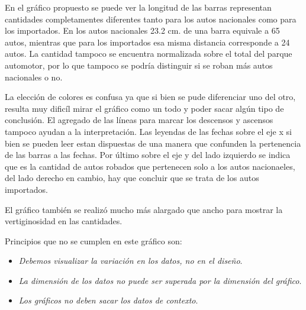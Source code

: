 \documentclass[
	12pt, %
	spanish, %
]{fphw}
\begin{document}
En el gráfico propuesto se puede ver la longitud de las barras representan cantidades completamentes diferentes tanto para los autos nacionales como para los importados. En los autos nacionales 23.2 cm. de una barra equivale a 65 autos, mientras que para los importados esa misma distancia corresponde a 24 autos. La cantidad tampoco se encuentra normalizada sobre el total del parque automotor, por lo que tampoco se podría distinguir si se roban más autos nacionales o no.

La elección de colores es confusa ya que si bien se pude diferenciar uno del otro, resulta muy dificíl mirar el gráfico como un todo y poder sacar algún tipo de conclusión. El agregado de las líneas para marcar los descensos y ascensos tampoco ayudan a la interpretación. Las leyendas de las fechas sobre el eje x si bien se pueden leer estan dispuestas de una manera que confunden la pertenencia de las barras a las fechas. Por último sobre el eje y del lado izquierdo se indica que es la cantidad de autos robados que pertenecen solo a los autos nacionaeles, del lado derecho en cambio, hay que concluir que se trata de los autos importados.

El gráfico también se realizó mucho más alargado que ancho para mostrar la vertiginosidad en las cantidades.

Principios que no se cumplen en este gráfico son:
\begin{itemize}
	\item \textit{Debemos visualizar la variación en los datos, no en el diseño}.
	\item \textit{La dimensión de los datos no puede ser superada por la dimensión del gráfico}.
	\item \textit{Los gráficos no deben sacar los datos de contexto}.
\end{itemize}
\end{document}
